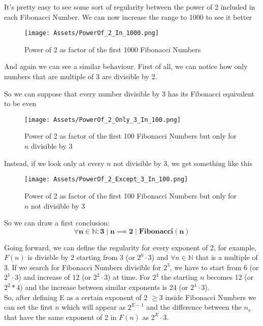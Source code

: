 \documentclass[amsmath,amssymb,aps,pra,reprint,groupedaddress,showpacs]{revtex4-1}
\begin{document}
It's pretty easy to see some sort of regularity between the power of 2 included in each Fibonacci Number. We can now increase the range to 1000 to see it better

\begin{figure}[H]
\centering
\texttt{[image: Assets/PowerOf\_2\_In\_1000.png]} %
\caption{Power of 2 as factor of the first 1000 Fibonacci Numbers}
\end{figure}

And again we can see a similar behaviour. First of all, we can notice how only numbers that are multiple of 3 are divisible by 2. 
  
So we can suppose that every number divisible by 3 has its Fibonacci equivalent to be even

\begin{figure}[H]
\centering
\texttt{[image: Assets/PowerOf\_2\_Only\_3\_In\_100.png]} %
\caption{Power of 2 as factor of the first 100 Fibonacci Numbers but only for $n$ divisible by 3}
\end{figure}

Instead, if we look only at every $n$ not divisible by 3, we get something like this

\begin{figure}[H]
\centering
\texttt{[image: Assets/PowerOf\_2\_Except\_3\_In\_100.png]} %
\caption{Power of 2 as factor of the first 100 Fibonacci Numbers but only for $n$ not divisible by 3}
\end{figure}

So we can draw a first conclusion: 
$$\mathbf{\forall n \in \mathbb{N} : 3\mid n \implies 2\mid Fibonacci(n)}$$

Going forward, we can define the regularity for every exponent of 2, 
for example, $F(n)$ is divisble by 2 starting from 3 (or $2^0 \cdot 3$) and $\forall n \in \mathbb{N}$ that is a multiple of 3.
If we search for Fibonacci Numbers divisible for $2^3$, we have to start from 6 (or $2^1 \cdot 3$)
and increase of 12 (or $2^2 \cdot 3$) at time. For $2^4$ the starting $n$ becomes 12 (or $2^2 * 4$)
and the increase between similar exponents is 24 (or $2^4 \cdot 3$).\\

So, after defining E as a certain exponent of 2 $\geq 3$ inside Fibonacci Numbers we can set the first $n$ which will appear as $2^{E-1}$ and the difference between the $n_s$ that have the same exponent of 2 in $F(n)$
as $2^E \cdot 3$.\\
\end{document}
